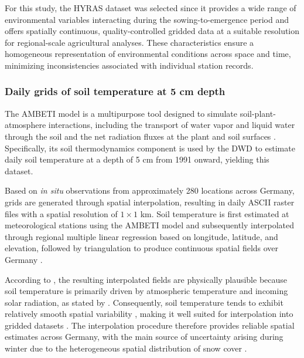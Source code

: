 \documentclass[10pt,authoryear]{elsarticle}
\begin{document}
{		For this study, the HYRAS dataset was selected since it provides a wide range of environmental variables interacting during the sowing-to-emergence period \citep{DWD_HYRAS_MaxTemp, DWD_HYRAS_MeanTemp, DWD_HYRAS_MinTemp, DWD_HYRAS_Precipitation, DWD_HYRAS_RelHumidity}  and offers spatially continuous, quality-controlled gridded data at a suitable resolution for regional-scale agricultural analyses. These characteristics ensure a homogeneous representation of environmental conditions across space and time, minimizing inconsistencies associated with individual station records.
		
		\subsubsection{Daily grids of soil temperature at 5 cm depth}
		
		The AMBETI model is a multipurpose tool designed to simulate soil-plant-atmosphere interactions, including the transport of water vapor and liquid water through the soil and the net radiation fluxes at the plant and soil surfaces \citep{Braden_1995}. Specifically, its soil thermodynamics component is used by the DWD to estimate daily soil temperature at a depth of 5 cm from 1991 onward, yielding this dataset.
		
		Based on \textit{in situ} observations from approximately 280 locations across Germany, grids are generated through spatial interpolation, resulting in daily ASCII raster files with a spatial resolution of $1\times1$ km. Soil temperature is first estimated at meteorological stations using the AMBETI model and subsequently interpolated through regional multiple linear regression based on longitude, latitude, and elevation, followed by triangulation to produce continuous spatial fields over Germany \citep{DWD_soiltemperature}.
		
		According to \cite{DWD_soiltemperature}, the resulting interpolated fields are physically plausible because soil temperature is primarily driven by atmospheric temperature and incoming solar radiation, as stated by \cite{BAUMBERGER_2024}. Consequently, soil temperature tends to exhibit relatively smooth spatial variability \citep{DWD_soiltemperature}, making it well suited for interpolation into gridded datasets \citep{Schloeder_2001}. The interpolation procedure therefore provides reliable spatial estimates across Germany, with the main source of uncertainty arising during winter due to the heterogeneous spatial distribution of snow cover \citep{DWD_soiltemperature}.
		
}
\end{document}
